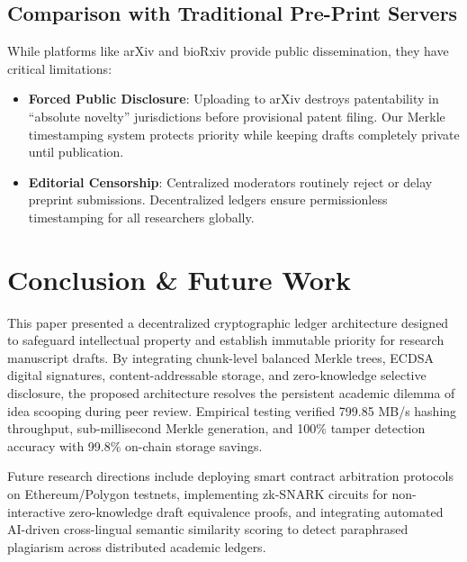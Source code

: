 \documentclass[conference]{IEEEtran}
\begin{document}
\subsection{Comparison with Traditional Pre-Print Servers}
While platforms like arXiv and bioRxiv provide public dissemination, they have critical limitations:
\begin{itemize}
    \item \textbf{Forced Public Disclosure}: Uploading to arXiv destroys patentability in ``absolute novelty'' jurisdictions before provisional patent filing. Our Merkle timestamping system protects priority while keeping drafts completely private until publication.
    \item \textbf{Editorial Censorship}: Centralized moderators routinely reject or delay preprint submissions. Decentralized ledgers ensure permissionless timestamping for all researchers globally.
\end{itemize}

\section{Conclusion \& Future Work}
This paper presented a decentralized cryptographic ledger architecture designed to safeguard intellectual property and establish immutable priority for research manuscript drafts. By integrating chunk-level balanced Merkle trees, ECDSA digital signatures, content-addressable storage, and zero-knowledge selective disclosure, the proposed architecture resolves the persistent academic dilemma of idea scooping during peer review. Empirical testing verified 799.85 MB/s hashing throughput, sub-millisecond Merkle generation, and 100\% tamper detection accuracy with 99.8\% on-chain storage savings.

Future research directions include deploying smart contract arbitration protocols on Ethereum/Polygon testnets, implementing zk-SNARK circuits for non-interactive zero-knowledge draft equivalence proofs, and integrating automated AI-driven cross-lingual semantic similarity scoring to detect paraphrased plagiarism across distributed academic ledgers.



\end{document}

